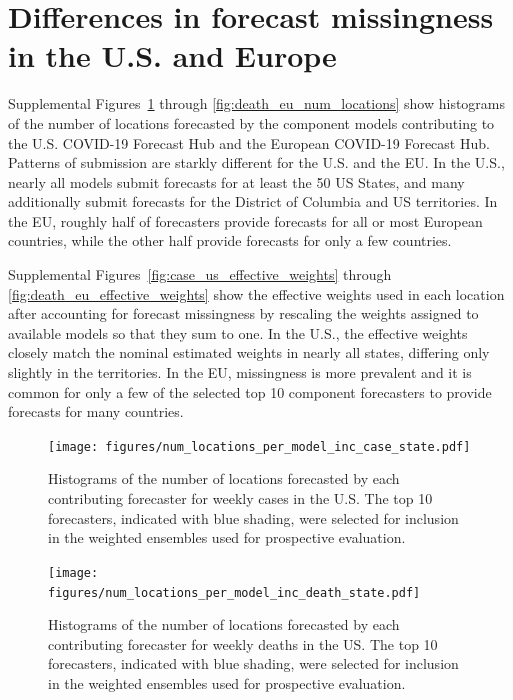\documentclass{article}
\begin{document}
\newpage

\section{Differences in forecast missingness in the U.S. and Europe}

Supplemental Figures~\ref{fig:case_us_num_locations} through \ref{fig:death_eu_num_locations} show histograms of the number of locations forecasted by the component models contributing to the U.S. COVID-19 Forecast Hub and the European COVID-19 Forecast Hub. Patterns of submission are starkly different for the U.S. and the EU. In the U.S., nearly all models submit forecasts for at least the 50 US States, and many additionally submit forecasts for the District of Columbia and US territories. In the EU, roughly half of forecasters provide forecasts for all or most European countries, while the other half provide forecasts for only a few countries.

Supplemental Figures~\ref{fig:case_us_effective_weights} through \ref{fig:death_eu_effective_weights} show the effective weights used in each location after accounting for forecast missingness by rescaling the weights assigned to available models so that they sum to one. In the U.S., the effective weights closely match the nominal estimated weights in nearly all states, differing only slightly in the territories. In the EU, missingness is more prevalent and it is common for only a few of the selected top 10 component forecasters to provide forecasts for many countries.

\begin{figure}
  \texttt{[image: figures/num\_locations\_per\_model\_inc\_case\_state.pdf]}
  \caption{Histograms of the number of locations forecasted by each contributing forecaster for weekly cases in the U.S. The top 10 forecasters, indicated with blue shading, were selected for inclusion in the weighted ensembles used for prospective evaluation.}
  \label{fig:case_us_num_locations}
\end{figure}

\begin{figure}
  \texttt{[image: figures/num\_locations\_per\_model\_inc\_death\_state.pdf]}
  \caption{Histograms of the number of locations forecasted by each contributing forecaster for weekly deaths in the US. The top 10 forecasters, indicated with blue shading, were selected for inclusion in the weighted ensembles used for prospective evaluation.}
  \label{fig:death_us_num_locations}
\end{figure}
\end{document}
